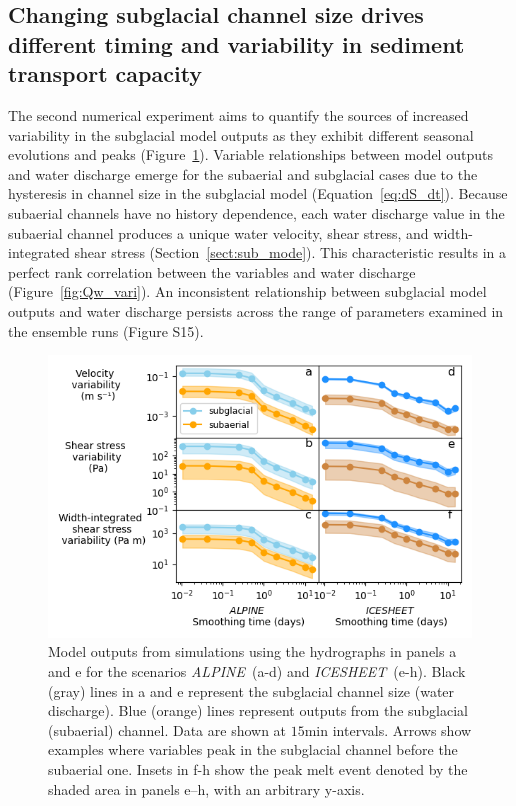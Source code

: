 \documentclass[esurf, manuscript]{copernicus}
\newcommand{\alpine}{\textit{ALPINE}\,}
\newcommand{\icesheet}{\textit{ICESHEET}\,}
\begin{document}
\FloatBarrier
\subsection{Changing subglacial channel size drives different timing and variability in sediment transport capacity}

The second numerical experiment aims to quantify the sources of increased variability in the subglacial model outputs as they exhibit different seasonal evolutions and peaks (Figure~\ref{fig:model_outs}).
Variable relationships between model outputs and water discharge emerge for the subaerial and subglacial cases due to the hysteresis in channel size in the subglacial model (Equation~\ref{eq:dS_dt}).
Because subaerial channels have no history dependence, each water discharge value in the subaerial channel produces a unique water velocity, shear stress, and width-integrated shear stress (Section~\ref{sect:sub_mode}).
This characteristic results in a perfect rank correlation between the variables and water discharge (Figure~\ref{fig:Qw_vari}).
An inconsistent relationship between subglacial model outputs and water discharge persists across the range of parameters examined in the ensemble runs (Figure S15).
\begin{figure}[hbt!]
  \centering
  \includegraphics[width=\linewidth]{Fig5.png}
  \caption{Model outputs from simulations using the hydrographs in panels a and e for the scenarios \alpine{} (a-d) and \icesheet{} (e-h).
    Black (gray) lines in a and e represent the subglacial channel size (water discharge).
    Blue (orange) lines represent outputs from the subglacial (subaerial) channel.
    Data are shown at $15$\unit{min} intervals.
    Arrows show examples where variables peak in the subglacial channel before the subaerial one.
    Insets in f-h show the peak melt event denoted by the shaded area in panels e--h, with an arbitrary y-axis.
  }
  \label{fig:model_outs}
\end{figure}
\end{document}
